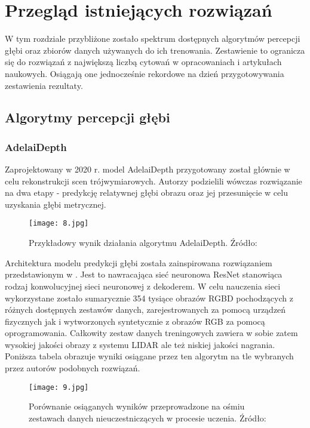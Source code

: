 \chapter{Przegląd istniejących rozwiązań}\label{chap:3_przegląd_istniejących_rozwiązań}

W tym rozdziale przybliżone zostało spektrum dostępnych algorytmów percepcji głębi oraz zbiorów danych używanych do ich trenowania. Zestawienie to ogranicza się do rozwiązań z największą liczbą cytowań w opracowaniach i artykułach naukowych. Osiągają one jednocześnie rekordowe na dzień przygotowywania zestawienia rezultaty.

\section{Algorytmy percepcji głębi}
\subsection{AdelaiDepth}
Zaprojektowany w 2020 r. model AdelaiDepth \cite{yin2020} przygotowany został głównie w celu rekonstrukcji scen trójwymiarowych. Autorzy podzielili wówczas rozwiązanie na dwa etapy - predykcję relatywnej głębi obrazu oraz jej przesunięcie w celu uzyskania głębi metrycznej.
\begin{figure}[H]
    \centering
    \texttt{[image: 8.jpg]}
    \caption{Przykładowy wynik działania algorytmu AdelaiDepth. Źródło: \cite{yin2020}}
    \label{fig:adelaidepth}
\end{figure}
Architektura modelu predykcji głębi została zainspirowana rozwiązaniem przedstawionym w \cite{xian2020}. Jest to nawracająca sieć neuronowa ResNet \cite{he2015} stanowiąca rodzaj konwolucyjnej sieci neuronowej z dekoderem. W celu nauczenia sieci wykorzystane zostało sumarycznie 354 tysiące obrazów RGBD pochodzących z różnych dostępnych zestawów danych, zarejestrowanych za pomocą urządzeń fizycznych jak i wytworzonych syntetycznie z obrazów RGB za pomocą oprogramowania. Całkowity zestaw danych treningowych zawiera w sobie zatem  wysokiej jakości obrazy z systemu LIDAR ale też niskiej jakości nagrania. Poniższa tabela obrazuje wyniki osiągane przez ten algorytm na tle wybranych przez autorów podobnych rozwiązań.
\begin{figure}[H]
    \centering
    \texttt{[image: 9.jpg]}
    \caption{Porównanie osiąganych wyników przeprowadzone na ośmiu zestawach danych nieuczestniczących w procesie uczenia. Źródło: \cite{yin2020}}
    \label{fig:adelaidepth-results}
\end{figure}

